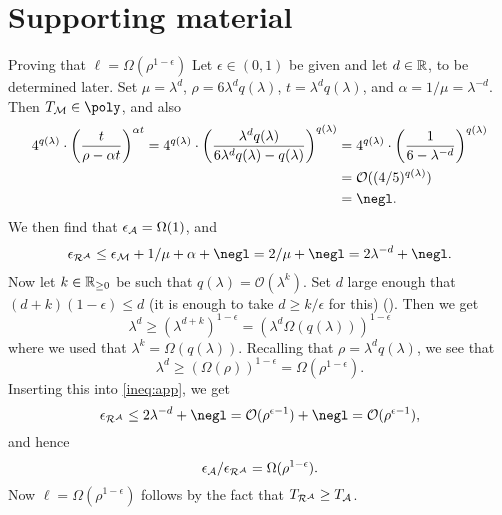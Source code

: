 
\section{Supporting material}


\begin{namedproof}{Proving that \(\ell = \Omega(\rho^{1-\epsilon})\)}
  Let \(\epsilon \in (0,1)\) be given
  and let \(d \in \mathbb{R}\), to be determined later.
  Set \(\mu = \lambda^{d}\), \(\rho = 6 \lambda^{d} q(\lambda)\), \(t = \lambda^{d} q(\lambda)\),
  and \(\alpha = 1/\mu = \lambda^{-d}\).
  Then \(T_{\redM} \in \poly\), and also
  \begin{align}
    4^{q(\lambda)} \cdot \left( \frac{t}{\rho - \alpha t} \right)^{\alpha t}
    =
    4^{q(\lambda)} \cdot \left( \frac{\lambda^{d} q(\lambda)}{6\lambda^{d} q(\lambda) - q(\lambda)} \right)^{q(\lambda)}
    & = 4^{q(\lambda)} \cdot \left( \frac{1}{6 - \lambda^{-d}} \right)^{q(\lambda)} \notag\\
    & = \mathcal{O}((4 / 5)^{q(\lambda)})\notag\\
    & = \negl \notag.
  \end{align}
  We then find that
  \(\epsilon_{\mathcal{A}} = \Omega(1)\), and
  \begin{align}\label{ineq:app}
    \epsilon_{\redR^{\advA}} \le \epsilon_{\redM} + 1/\mu + \alpha + \negl
    = 2/\mu + \negl
    = 2\lambda^{-d} + \negl.
  \end{align}
  Now let \(k \in \mathbb{R}_{\ge 0}\) be such that \(q(\lambda) = \mathcal{O}(\lambda^{k})\).
  Set \(d\) large enough that \((d+k)(1-\epsilon) \le d\)
  (it is enough to take \(d \ge k/\epsilon\) for this) ().
  Then we get
  \[
    \lambda^{d} \ge (\lambda^{d+k})^{1-\epsilon} = (\lambda^{d} \Omega(q(\lambda)))^{1-\epsilon}
  \]
  where we used that \(\lambda^{k} = \Omega(q(\lambda))\).
  Recalling that \(\rho = \lambda^{d} q(\lambda)\), we see that
  \[
    \lambda^{d} \ge (\Omega(\rho))^{1-\epsilon} = \Omega(\rho^{1-\epsilon}).
  \]
  Inserting this into \eqref{ineq:app}, we get
  \[
    \epsilon_{\redR^{\advA}} \le 2\lambda^{-d} + \negl
    = \mathcal{O}(\rho^{\epsilon-1}) + \negl
    = \mathcal{O}(\rho^{\epsilon-1}),
  \]
  and hence
  \[
    \epsilon_{\advA} / \epsilon_{\redR^{\advA}} = \Omega(\rho^{1-\epsilon}).
  \]
  Now \(\ell = \Omega(\rho^{1-\epsilon})\) follows by the fact that \(T_{\redR^{\advA}} \ge T_{\advA}\).
\end{namedproof}



